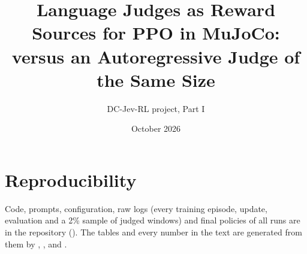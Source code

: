 \documentclass[11pt]{article}
\title{Language Judges as Reward Sources for PPO in MuJoCo:\\\kev{} versus an Autoregressive Judge of the Same Size}
\author{DC-Jev-RL project, Part I}
\date{October 2026}
\begin{document}
\maketitle

\begin{abstract}

\end{abstract}







\section*{Reproducibility}
Code, prompts, configuration, raw logs (every training episode, update, evaluation and a 2\% sample of judged windows)
and final policies of all runs are in the repository (). The tables and every number
in the text are generated from them by , ,
 and
.



\end{document}
